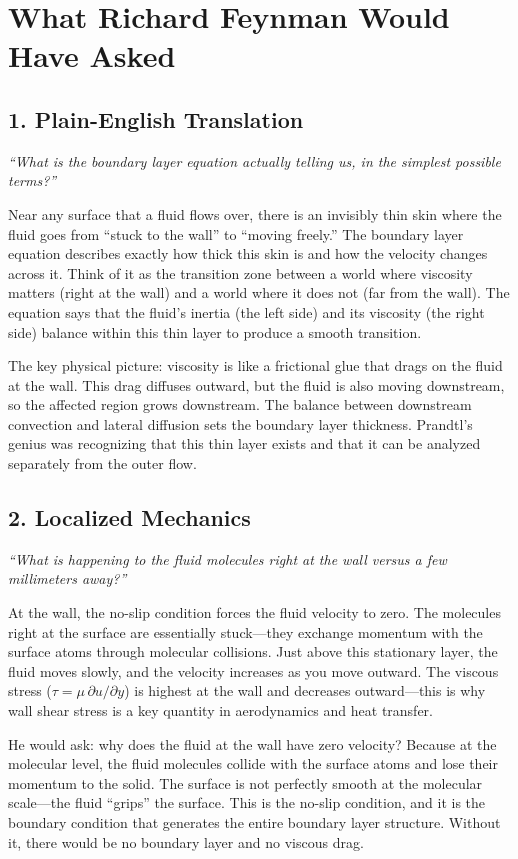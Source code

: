 \section*{What Richard Feynman Would Have Asked}

\subsection*{1. Plain-English Translation}
\textit{``What is the boundary layer equation actually telling us, in the simplest possible terms?''}

Near any surface that a fluid flows over, there is an invisibly thin skin where the fluid goes from ``stuck to the wall'' to ``moving freely.'' The boundary layer equation describes exactly how thick this skin is and how the velocity changes across it. Think of it as the transition zone between a world where viscosity matters (right at the wall) and a world where it does not (far from the wall). The equation says that the fluid's inertia (the left side) and its viscosity (the right side) balance within this thin layer to produce a smooth transition.

The key physical picture: viscosity is like a frictional glue that drags on the fluid at the wall. This drag diffuses outward, but the fluid is also moving downstream, so the affected region grows downstream. The balance between downstream convection and lateral diffusion sets the boundary layer thickness. Prandtl's genius was recognizing that this thin layer exists and that it can be analyzed separately from the outer flow.

\subsection*{2. Localized Mechanics}
\textit{``What is happening to the fluid molecules right at the wall versus a few millimeters away?''}

At the wall, the no-slip condition forces the fluid velocity to zero. The molecules right at the surface are essentially stuck---they exchange momentum with the surface atoms through molecular collisions. Just above this stationary layer, the fluid moves slowly, and the velocity increases as you move outward. The viscous stress ($\tau = \mu \, \partial u / \partial y$) is highest at the wall and decreases outward---this is why wall shear stress is a key quantity in aerodynamics and heat transfer.

He would ask: why does the fluid at the wall have zero velocity? Because at the molecular level, the fluid molecules collide with the surface atoms and lose their momentum to the solid. The surface is not perfectly smooth at the molecular scale---the fluid ``grips'' the surface. This is the no-slip condition, and it is the boundary condition that generates the entire boundary layer structure. Without it, there would be no boundary layer and no viscous drag.

